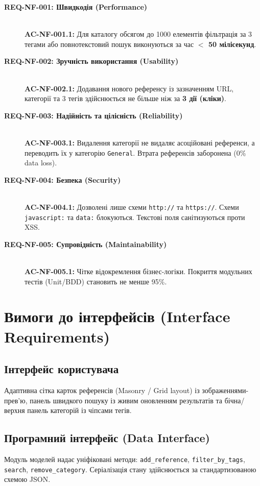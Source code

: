 \documentclass[12pt,a4paper]{article}
\begin{document}
\begin{description}
    \item[\textbf{REQ-NF-001: Швидкодія (Performance)}] \hfill \\
    \textbf{AC-NF-001.1:} Для каталогу обсягом до 1000 елементів фільтрація за 3 тегами або повнотекстовий пошук виконуються за час \textbf{$<$ 50 мілісекунд}.

    \item[\textbf{REQ-NF-002: Зручність використання (Usability)}] \hfill \\
    \textbf{AC-NF-002.1:} Додавання нового референсу із зазначенням URL, категорії та 3 тегів здійснюється не більше ніж за \textbf{3 дії (кліки)}.

    \item[\textbf{REQ-NF-003: Надійність та цілісність (Reliability)}] \hfill \\
    \textbf{AC-NF-003.1:} Видалення категорії не видаляє асоційовані референси, а переводить їх у категорію \texttt{General}. Втрата референсів заборонена (0\% data loss).

    \item[\textbf{REQ-NF-004: Безпека (Security)}] \hfill \\
    \textbf{AC-NF-004.1:} Дозволені лише схеми \texttt{http://} та \texttt{https://}. Схеми \texttt{javascript:} та \texttt{data:} блокуються. Текстові поля санітизуються проти XSS.

    \item[\textbf{REQ-NF-005: Супровідність (Maintainability)}] \hfill \\
    \textbf{AC-NF-005.1:} Чітке відокремлення бізнес-логіки. Покриття модульних тестів (Unit/BDD) становить не менше 95\%.
\end{description}

\section{Вимоги до інтерфейсів (Interface Requirements)}
\subsection{Інтерфейс користувача}
Адаптивна сітка карток референсів (Masonry / Grid layout) із зображеннями-прев'ю, панель швидкого пошуку із живим оновленням результатів та бічна/верхня панель категорій із чіпсами тегів.

\subsection{Програмний інтерфейс (Data Interface)}
Модуль моделей надає уніфіковані методи: \texttt{add\_reference}, \texttt{filter\_by\_tags}, \texttt{search}, \texttt{remove\_category}. Серіалізація стану здійснюється за стандартизованою схемою JSON.
\end{document}
